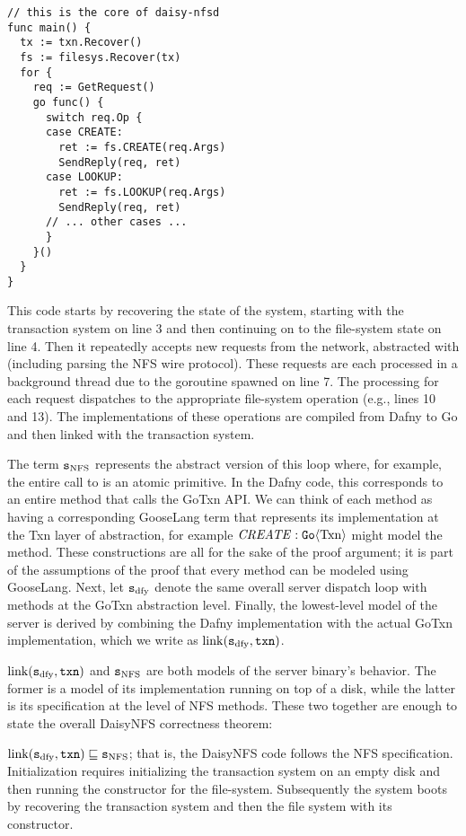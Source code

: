 \begin{verbatim}
// this is the core of daisy-nfsd
func main() {
  tx := txn.Recover()
  fs := filesys.Recover(tx)
  for {
    req := GetRequest()
    go func() {
      switch req.Op {
      case CREATE:
        ret := fs.CREATE(req.Args)
        SendReply(req, ret)
      case LOOKUP:
        ret := fs.LOOKUP(req.Args)
        SendReply(req, ret)
      // ... other cases ...
      }
    }()
  }
}
\end{verbatim}

This code starts by recovering the state of the system, starting with the
transaction system on line 3 and then continuing on to the file-system state on
line 4. Then it repeatedly accepts new requests from the network, abstracted
with  (including parsing the NFS wire protocol). These requests
are each processed in a background thread due to the goroutine spawned on line
7. The processing for each request dispatches to the appropriate file-system
operation (e.g., lines 10 and 13). The implementations of these operations are
compiled from Dafny to Go and then linked with the transaction system.

The term $\texttt{s}_{\mathrm{NFS}}$ represents the abstract version of this loop where, for example,
the entire call to  is an atomic primitive. In the Dafny code,
this corresponds to an entire method that calls the GoTxn API. We can think of
each method as having a corresponding GooseLang term that represents its
implementation at the Txn layer of abstraction, for example
$\mathit{CREATE} : \mathtt{Go}\langle \mathrm{Txn} \rangle$ might model the  method.
These constructions are all for the sake of the proof argument; it is part of
the assumptions of the proof that every method can be modeled using GooseLang.
Next, let $\texttt{s}_{\mathrm{dfy}}$ denote the same overall server dispatch loop with
methods at the GoTxn abstraction level. Finally, the lowest-level model of the
server is derived by combining the Dafny implementation with the actual GoTxn
implementation, which we write as $\mathrm{link}(\texttt{s}_{\mathrm{dfy}}, \texttt{txn})$.

$\mathrm{link}(\texttt{s}_{\mathrm{dfy}}, \texttt{txn})$ and $\texttt{s}_{\mathrm{NFS}}$ are both models of the  server binary's
behavior. The former is a model of its implementation running on top of a disk,
while the latter is its specification at the level of NFS methods. These two
together are enough to state the overall DaisyNFS correctness theorem:
%
\begin{theorem} $\mathrm{link}(\texttt{s}_{\mathrm{dfy}}, \texttt{txn}) \sqsubseteq \texttt{s}_{\mathrm{NFS}}$; that is, the
  DaisyNFS code follows the NFS specification.
  Initialization requires initializing the
  transaction system on an empty disk and then running the 
  constructor for the file-system. Subsequently the system boots by recovering the
  transaction system and then the file system with its  constructor.
  \label{thm:daisy}
\end{theorem}

